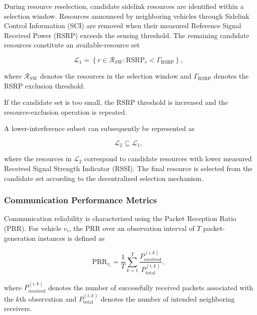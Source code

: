 During resource reselection, candidate sidelink resources are identified
within a selection window. Resources announced by neighboring vehicles
through Sidelink Control Information (SCI) are removed when their measured
Reference Signal Received Power (RSRP) exceeds the sensing threshold. The
remaining candidate resources constitute an available-resource set

\begin{equation}
\mathcal{L}_1
=
\left\{
r\in\mathcal{R}_{\mathrm{SW}}
:
\mathrm{RSRP}_{r}
<
\Gamma_{\mathrm{RSRP}}
\right\},
\label{eq:isac_candidate_set_l1}
\end{equation}

where $\mathcal{R}_{\mathrm{SW}}$ denotes the resources in the selection
window and $\Gamma_{\mathrm{RSRP}}$ denotes the RSRP exclusion threshold.

If the candidate set is too small, the RSRP threshold is increased and the
resource-exclusion operation is repeated.

A lower-interference subset can subsequently be represented as

\begin{equation}
\mathcal{L}_2
\subseteq
\mathcal{L}_1,
\label{eq:isac_candidate_set_l2}
\end{equation}

where the resources in $\mathcal{L}_2$ correspond to candidate resources
with lower measured Received Signal Strength Indicator (RSSI). The final
resource is selected from the candidate set according to the decentralized
selection mechanism.

\subsubsection{Communication Performance Metrics}

Communication reliability is characterized using the Packet Reception
Ratio (PRR). For vehicle $v_i$, the PRR over an observation interval of
$T$ packet-generation instances is defined as

\begin{equation}
\mathrm{PRR}_{v_i}
=
\frac{1}{T}
\sum_{k=1}^{T}
\frac{
P_{\mathrm{received}}^{(i,k)}
}{
P_{\mathrm{total}}^{(i,k)}
},
\label{eq:isac_prr}
\end{equation}

where $P_{\mathrm{received}}^{(i,k)}$ denotes the number of successfully
received packets associated with the $k$th observation and
$P_{\mathrm{total}}^{(i,k)}$ denotes the number of intended neighboring
receivers.

